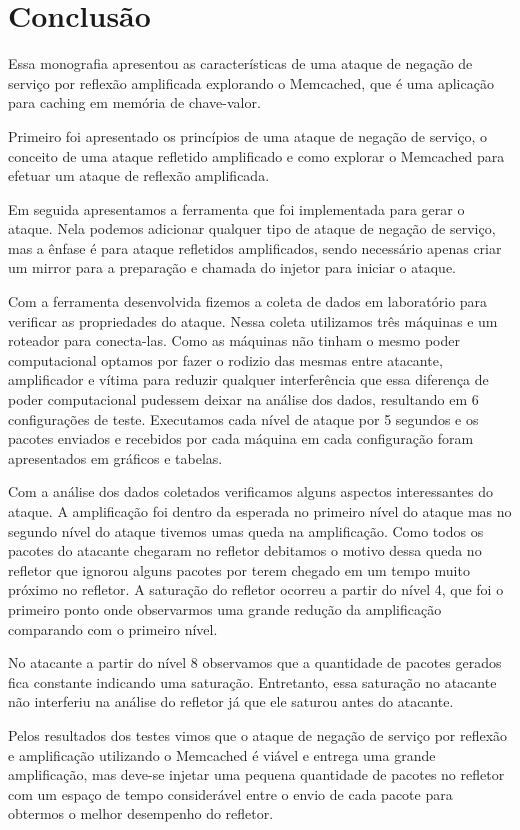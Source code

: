 \section{Conclusão}

Essa monografia apresentou as características de uma ataque de negação de serviço por reflexão amplificada explorando o Memcached, que é uma aplicação para caching em memória de chave-valor.

Primeiro foi apresentado os princípios de uma ataque de negação de serviço, o conceito de uma ataque refletido amplificado e como explorar o Memcached para efetuar um ataque de reflexão amplificada.

Em seguida apresentamos a ferramenta que foi implementada para gerar o ataque. Nela podemos adicionar qualquer tipo de ataque de negação de serviço, mas a ênfase é para ataque refletidos amplificados, sendo necessário apenas criar um mirror para a preparação e chamada do injetor para iniciar o ataque.

Com a ferramenta desenvolvida fizemos a coleta de dados em laboratório para verificar as propriedades do ataque. Nessa coleta utilizamos três máquinas e um roteador para conecta-las. Como as máquinas não tinham o mesmo poder computacional optamos por fazer o rodizio das mesmas entre atacante, amplificador e vítima para reduzir qualquer interferência que essa diferença de poder computacional pudessem deixar na análise dos dados, resultando em 6 configurações de teste. Executamos cada nível de ataque por 5 segundos e os pacotes enviados e recebidos por cada máquina em cada configuração foram apresentados em gráficos e tabelas. 

Com a análise dos dados coletados verificamos alguns aspectos interessantes do ataque. A amplificação foi dentro da esperada no primeiro nível do ataque mas no segundo nível do ataque tivemos umas queda na amplificação. Como todos os pacotes do atacante chegaram no refletor debitamos o motivo dessa queda no refletor que ignorou alguns pacotes por terem chegado em um tempo muito próximo no refletor. A saturação do refletor ocorreu a partir do nível 4, que foi o primeiro ponto onde observarmos uma grande redução da amplificação comparando com o primeiro nível.

No atacante a partir do nível 8 observamos que a quantidade de pacotes gerados fica constante indicando uma saturação. Entretanto, essa saturação no atacante não interferiu na análise do refletor já que ele saturou antes do atacante. 

Pelos resultados dos testes vimos que o ataque de negação de serviço por reflexão e amplificação utilizando o Memcached é viável e entrega uma grande amplificação, mas deve-se injetar uma pequena quantidade de pacotes no refletor com um espaço de tempo considerável entre o envio de cada pacote para obtermos o melhor desempenho do refletor. 


